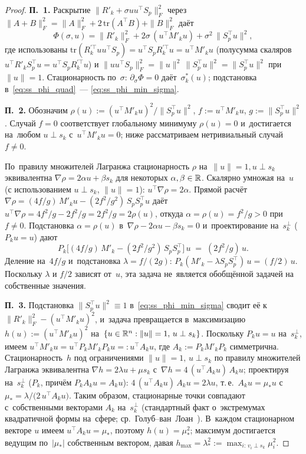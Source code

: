 \begin{proof}
\textbf{П.~1.} Раскрытие $\|R'_k + \sigma uu^\top S_p\|_F^2$ через
$\|A+B\|_F^2 = \|A\|_F^2 + 2\,\mathrm{tr}(A^\top B) + \|B\|_F^2$ даёт
\begin{equation}\label{eq:ss_phi_quad}
  \Phi(\sigma, u)
  = \|R'_k\|_F^2 + 2\sigma\,(u^\top M'_k u) + \sigma^2\,\|S_p^\top u\|^2,
\end{equation}
где использованы $\mathrm{tr}(R_k^{\prime\top} u u^\top S_p) = u^\top S_p R_k^{\prime\top} u = u^\top M'_k u$
(полусумма скаляров $u^\top R'_k S_p^\top u = u^\top S_p R_k^{\prime\top} u$) и
$\|u u^\top S_p\|_F^2 = \|u\|^2\,\|S_p^\top u\|^2 = \|S_p^\top u\|^2$ при~$\|u\|=1$.
Стационарность по~$\sigma$: $\partial_\sigma \Phi = 0$
даёт~$\sigma_k^*(u)$; подстановка в~\eqref{eq:ss_phi_quad}~--- \eqref{eq:ss_phi_min_sigma}.

\textbf{П.~2.} Обозначим $\rho(u) := (u^\top M'_k u)^2/\|S_p^\top u\|^2$,
$f := u^\top M'_k u$, $g := \|S_p^\top u\|^2$. Случай $f=0$ соответствует
глобальному минимуму $\rho(u)=0$ и~достигается на~любом $u\perp s_k$
с~$u^\top M'_k u=0$; ниже рассматриваем нетривиальный случай $f\ne 0$.

По~правилу множителей Лагранжа стационарность $\rho$ на~$\|u\|=1, u\perp s_k$
эквивалентна $\nabla\rho = 2\alpha u + \beta s_k$ для некоторых $\alpha, \beta\in\mathbb{R}$.
Скалярно умножая на~$u$ (с использованием $u\perp s_k$, $\|u\|=1$):
$u^\top\nabla\rho = 2\alpha$. Прямой расчёт
$\nabla\rho = (4f/g)\,M'_k u - (2f^2/g^2)\,S_p S_p^\top u$ даёт
$u^\top\nabla\rho = 4f^2/g - 2f^2/g = 2f^2/g = 2\rho(u)$, откуда
$\alpha = \rho(u) = f^2/g > 0$ при~$f\ne 0$.
Подстановка $\alpha = \rho(u)$ в~$\nabla\rho - 2\alpha u - \beta s_k = 0$
и~проектирование на~$s_k^\perp$ ($P_k u = u$) дают
\[
  P_k\bigl[(4f/g)\,M'_k - (2f^2/g^2)\,S_p S_p^\top\bigr]\, u
  \;=\; (2f^2/g)\,u.
\]
Деление на~$4f/g$ и~подстановка $\lambda = f/(2g)$:
$P_k(M'_k - \lambda S_p S_p^\top)\,u = (f/2)\,u$. Поскольку $\lambda$ и $f/2$
зависят от~$u$, эта задача не~является обобщённой задачей на собственные значения.

\textbf{П.~3.} Подстановка $\|S_p^\top u\|^2 \equiv 1$ в~\eqref{eq:ss_phi_min_sigma}
сводит её к~$\|R'_k\|_F^2 - (u^\top M'_k u)^2$, и~задача превращается в~максимизацию
$h(u) := (u^\top M'_k u)^2$ на~$\{u\in\mathbb{R}^n: \|u\|=1,\,u\perp s_k\}$.
Поскольку $P_k u = u$ на~$s_k^\perp$, имеем $u^\top M'_k u = u^\top P_k M'_k P_k u
=: u^\top A_k u$, где $A_k := P_k M'_k P_k$ симметрична. Стационарность~$h$
под ограничениями $\|u\|=1,\,u\perp s_k$ по правилу множителей Лагранжа
эквивалентна $\nabla h = 2\lambda u + \mu s_k$ с~$\nabla h = 4\,(u^\top A_k u)\,A_k u$;
проектируя на~$s_k^\perp$ ($P_k$, причём $P_k A_k u = A_k u$):
$4\,(u^\top A_k u)\,A_k u = 2\lambda u$, т.\,е.\
$A_k u = \mu_* u$ с~$\mu_* = \lambda/\bigl(2\,u^\top A_k u\bigr)$. Таким образом,
стационарные точки совпадают с~собственными векторами $A_k$ на~$s_k^\perp$
(стандартный факт о~экстремумах квадратичной формы на~сфере;
ср.\ Голуб--ван~Лоан~\cite[\S 8.1]{golub2013}).
В~каждом стационарном векторе $u$ имеем $u^\top A_k u = \mu_*$, поэтому
$h(u) = \mu_*^2$; максимум достигается ведущим по~$|\mu_*|$ собственным вектором,
давая $h_{\max} = \lambda_*^2 := \max_{i:\,v_i\perp s_k}\mu_i^2$.
\end{proof}

